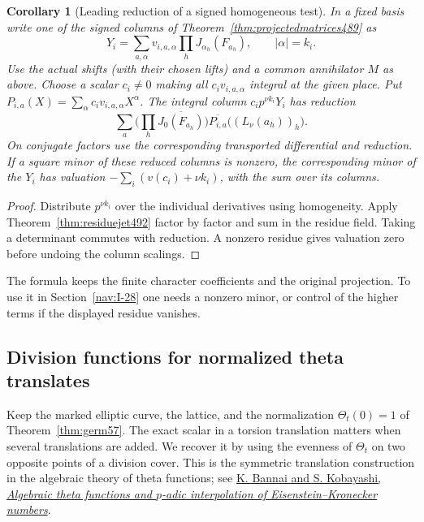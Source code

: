 \documentclass[a4paper,11pt]{article}
\newtheorem{corollary}[proposition]{Corollary}
\theoremstyle{definition}
\theoremstyle{remark}
\numberwithin{equation}{section}
\begin{document}
\begin{corollary}[Leading reduction of a signed homogeneous test]\leavevmode
\label{cor:residuecolumn492}
In a fixed basis write one of the signed columns of
Theorem~\ref{thm:projectedmatrices489} as
\[
  Y_i=\sum_{a,\alpha}v_{i,a,\alpha}
                    \prod_h J_{\alpha_h}(F_{a_h}),\qquad
  |\alpha|=k_i .
\]
Use the actual shifts (with their chosen lifts) and a common
annihilator \(M\) as above. Choose a scalar \(c_i\ne0\) making
all \(c_iv_{i,a,\alpha}\) integral at the given place. Put
\(P_{i,a}(X)=\sum_\alpha c_i v_{i,a,\alpha}X^\alpha\).
The integral column \(c_i p^{\nu k_i}Y_i\) has reduction
\[
  \sum_a\Big(\prod_h\overline{J_0(F_{a_h})}\Big)
           \overline{P_{i,a}}\big((L_\nu(a_h))_h\big).
\]
On conjugate factors use the corresponding transported differential
and reduction. If a square minor of these reduced columns is
nonzero, the corresponding minor of the \(Y_i\) has valuation
\(-\sum_i(v(c_i)+\nu k_i)\), with the sum over its columns.
\end{corollary}
\begin{proof}
Distribute \(p^{\nu k_i}\) over the individual derivatives using
homogeneity. Apply Theorem~\ref{thm:residuejet492} factor by
factor and sum in the residue field. Taking a determinant commutes
with reduction. A nonzero residue gives valuation zero before
undoing the column scalings.
\end{proof}
The formula keeps the finite character coefficients and the original
projection. To use it in Section~\ref{nav:I-28} one needs a
nonzero minor, or control of the higher terms if the displayed
residue vanishes.


\subsection{Division functions for normalized theta translates}
\label{sec:divisionphase493}

Keep the marked elliptic curve, the lattice, and the normalization
\(\Theta_t(0)=1\) of Theorem~\ref{thm:germ57}. The exact scalar in
a torsion translation matters when several translations are added.
We recover it by using the evenness of \(\Theta_t\) on two opposite
points of a division cover. This is the symmetric translation
construction in the algebraic theory of theta functions; see
\href{https://arxiv.org/abs/math/0610163}{K. Bannai and
S. Kobayashi, \emph{Algebraic theta functions and \(p\)-adic
interpolation of Eisenstein--Kronecker numbers}}.
\end{document}
